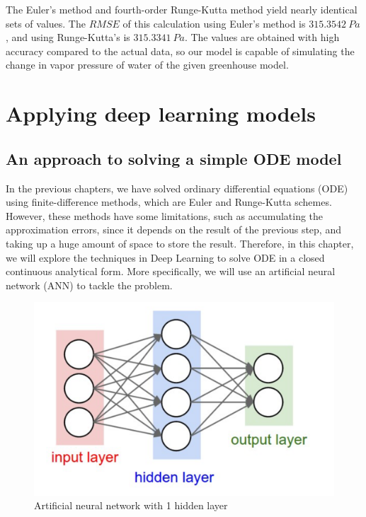 \documentclass[a4paper]{article}
\numberwithin{equation}{section}
\begin{document}
The Euler's method and fourth-order Runge-Kutta method yield nearly identical sets of values. The \( RMSE \) of this calculation using Euler's method is \( 315.3542\ Pa \), and using Runge-Kutta's is \( 315.3341\ Pa \). The values are obtained with high accuracy compared to the actual data, so our model is capable of simulating the change in vapor pressure of water of the given greenhouse model.

\newpage
\section{Applying deep learning models}
\subsection{An approach to solving a simple ODE model}
In the previous chapters, we have solved ordinary differential equations (ODE) using finite-difference methods, which are Euler and Runge-Kutta schemes. However, these methods have some limitations, such as accumulating the approximation errors, since it depends on the result of the previous step, and taking up a huge amount of space to store the result. Therefore, in this chapter, we will explore the techniques in Deep Learning to solve ODE in a closed continuous analytical form. More specifically, we will use an artificial neural network (ANN) to tackle the problem.

\begin{figure}[H]
  \centering
  \includegraphics[width=\textwidth]{nn.png}
  \caption{Artificial neural network with 1 hidden layer}
\end{figure}
\end{document}
